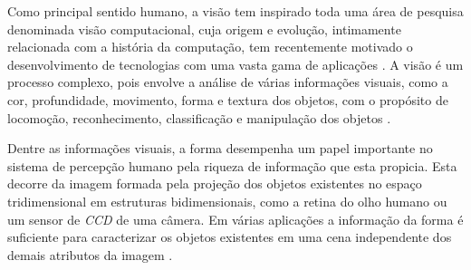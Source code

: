 


Como principal sentido humano, a visão tem inspirado toda uma área de pesquisa denominada visão computacional, cuja origem e evolução, intimamente relacionada com a história da computação, tem recentemente motivado o desenvolvimento de tecnologias com uma vasta gama de aplicações \cite{Costa:2009}. A visão é um processo complexo, pois envolve a análise de várias informações visuais, como a cor, profundidade, movimento, forma e textura dos objetos, com o propósito de locomoção, reconhecimento, classificação e manipulação dos objetos \cite{Ullman:1996}.


Dentre as informações visuais, a forma desempenha um papel importante no sistema de percepção humano pela riqueza de informação que esta propicia. Esta decorre da imagem formada pela projeção dos objetos existentes no espaço tridimensional em estruturas bidimensionais, como a retina do olho humano ou um sensor de \emph{CCD} de uma câmera. Em várias aplicações a informação da forma é suficiente para caracterizar os objetos existentes em uma cena independente dos demais atributos da imagem \cite{Costa:2009}.


